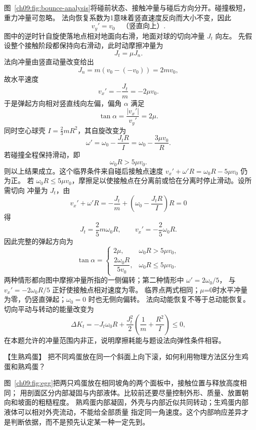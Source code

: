 {\begin{xesolution}
图~\ref{ch09:fig:bounce-analysis}将碰前状态、接触冲量与碰后方向分开。碰撞极短，重力冲量可忽略。
\bounceSpinDiagram
法向恢复系数为1意味着竖直速度反向而大小不变，因此
\[
 v_y'=v_0 \quad\text{（竖直向上）}.
\]
图中的逆时针自旋使落地点相对地面向右滑，地面对球的切向冲量 $J_t$ 向左。
先假设整个接触阶段都保持向右滑动，此时动摩擦冲量为
\[
 J_t=\mu J_n.
\]
法向冲量由竖直动量改变给出
\[
 J_n=m(v_0-(-v_0))=2mv_0,
\]
故水平速度
\[
 \boxed{v_x'=-\frac{J_t}{m}=-2\mu v_0}.
\]
于是弹起方向相对竖直线向左偏，偏角 $\alpha$ 满足
\[
 \boxed{\tan\alpha=\frac{|v_x'|}{v_y'}=2\mu}.
\]
同时空心球壳 $I=\tfrac23mR^2$，其自旋改变为
\[
 \omega' =\omega_0-\frac{J_tR}{I}
 =\omega_0-\frac{3\mu v_0}{R}.
\]
若碰撞全程保持滑动，即
\[
 \omega_0R>5\mu v_0.
\]
则以上结果成立。这个临界条件来自碰后接触点速度
$v_x'+\omega'R=\omega_0R-5\mu v_0$ 仍为正。
若 $\omega_0R\leq5\mu v_0$，摩擦足以使接触点在分离前或恰在分离时停止滑动。设所需切向
冲量为 $J_t$，由
\[
 v_x'+\omega'R
 =-\frac{J_t}{m}+\left(\omega_0-\frac{J_tR}{I}\right)R=0
\]
得
\[
 J_t=\frac{2}{5}m\omega_0R,
 \qquad
 v_x'=-\frac25\omega_0R.
\]
因此完整的弹起方向为
\[
 \boxed{
 \tan\alpha=
 \begin{cases}
  2\mu, & \omega_0R>5\mu v_0,\\[2pt]
  \dfrac{2\omega_0R}{5v_0}, & \omega_0R\leq5\mu v_0.
 \end{cases}}
\]
两种情形都向图中摩擦冲量所指的一侧偏转；第二种情形中 $\omega'=2\omega_0/5$，
与 $v_x'=-2\omega_0R/5$ 正好使接触点相对速度为零。
临界点两式相同；$\mu$=0时水平冲量为零，仍竖直弹起；$\omega_0=0$ 时也无侧向偏转。
法向动能恢复不等于总动能恢复。切向平动与转动的能量改变为
\[
 \Delta K_t=-J_t\omega_0R+\frac{J_t^2}{2}\left(\frac1m+\frac{R^2}{I}\right)\le0,
\]
在本题允许的冲量范围内非正，说明摩擦耗能与题设法向弹性条件相容。
\end{xesolution}

\begin{origexamplebox}{【生熟鸡蛋】}\label{ch09:ex:s17-15-6}
把不同鸡蛋放在同一个斜面上向下滚，如何利用物理方法区分生鸡蛋和熟鸡蛋？


\ThQEggs
\end{origexamplebox}

\begin{xesolution}
\eggRollingDiagram

图~\ref{ch09:fig:egg}把两只鸡蛋放在相同坡角的两个面板中，接触位置与释放高度相同；
用剖面区分内部凝固与内部液体。比较前还要尽量控制外形、质量、放置朝向和坡面的粗糙程度。
熟鸡蛋内部凝固，外壳与内部近似共同转动；生鸡蛋内部液体可以相对外壳流动，不能给全部质量
指定同一角速度。这个内部响应差异才是判断依据，而不是预先认定某一种一定先到。


\end{xesolution}}
